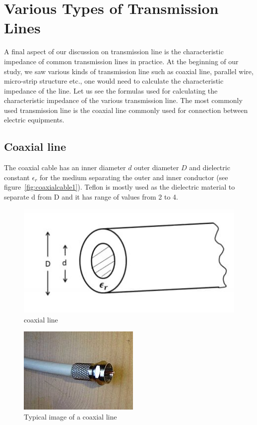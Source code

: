 \section{Various Types of Transmission Lines}\label{lec:lec15}
A final aspect of our discussion on transmission line is the characteristic impedance of common transmission lines in practice. At the beginning of our study, we saw various kinds of transmission line such as coaxial line, parallel wire, micro-strip structure etc., one would need to calculate the characteristic impedance of the line. Let us see the formulas used for calculating the characteristic impedance of the various transmission line. The most commonly used transmission line is the coaxial line commonly used for connection between electric equipments.

\subsection{Coaxial line}
The coaxial cable has an inner diameter $d$ outer diameter $D$ and dielectric constant $\epsilon_r$ for the medium separating the outer and inner conductor (see figure~\ref{fig:coaxialcable1}). Teflon is mostly used as the dielectric material to separate d from D and it has range of values from 2 to 4.
\begin{figure}[h]
\centering
\includegraphics[width=1\linewidth]{graphics/cylindricalspehere}
\caption{coaxial line}
\label{fig:cylindricalspehere}
\end{figure}
\begin{figure}[h]
\centering
\includegraphics[scale=0.8]{graphics/coaxialcable}
\caption{Typical image of a coaxial line}
\end{figure}

